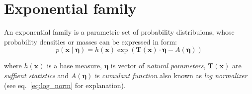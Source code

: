 \section{Exponential family} \label{sec:exp_family}
An exponential family is a parametric set of probability distribuions, whose probability densities or masses can be expressed in form:
\begin{equation}
    p(\boldsymbol{x}\mid \boldsymbol{\eta}) = h(\boldsymbol{x}) \exp( \boldsymbol{T}(\boldsymbol{x}) \cdot \boldsymbol{\eta} - A(\boldsymbol{\eta})) \label{eq:exp-fam}
\end{equation}

where $h(\boldsymbol{x})$ is a base measure, $\boldsymbol{\eta}$ is vector of \textit{natural parameters}, 
$\boldsymbol{T}(\boldsymbol{x})$ are \textit{suffient statistics} and  $A(\boldsymbol{\eta})$ is \textit{cumulant function} 
also known as \textit{log normalizer} (see eq.~\ref{eq:log_norm} for explanation).

